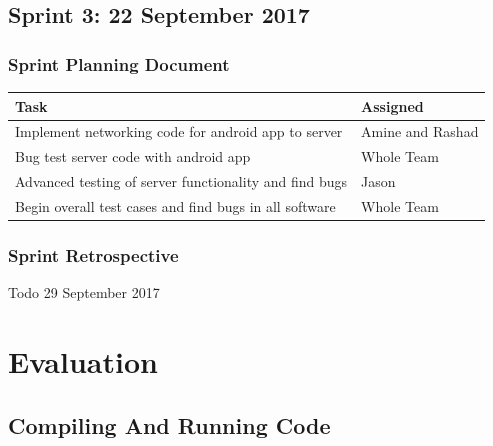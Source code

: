 \documentclass[a4paper,12pt]{article}
\begin{document}
\subsection{Sprint 3: 22 September 2017}
\subsubsection{Sprint Planning Document}
\begin{tabular}{|p{9.5cm}|p{3.5cm}|}
\hline
Task & Assigned \\ \hline
Implement networking code for android app to server & Amine and Rashad \\ \hline
Bug test server code with android app & Whole Team \\ \hline
Advanced testing of server functionality and find bugs & Jason \\ \hline
Begin overall test cases and find bugs in all software & Whole Team \\ \hline
\end{tabular}

\subsubsection{Sprint Retrospective}
Todo 29 September 2017

\newpage
\section{Evaluation}
\subsection{Compiling And Running Code}
\end{document}
